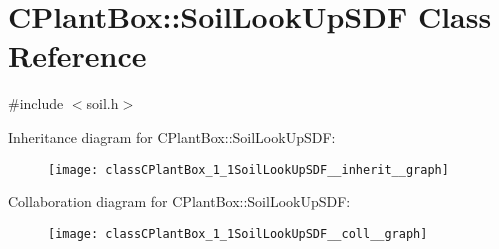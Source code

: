 \hypertarget{classCPlantBox_1_1SoilLookUpSDF}{}\section{C\+Plant\+Box\+:\+:Soil\+Look\+Up\+S\+DF Class Reference}
\label{classCPlantBox_1_1SoilLookUpSDF}


{\ttfamily \#include $<$soil.\+h$>$}



Inheritance diagram for C\+Plant\+Box\+:\+:Soil\+Look\+Up\+S\+DF\+:\nopagebreak
\begin{figure}[H]
\begin{center}
\leavevmode
\texttt{[image: classCPlantBox\_1\_1SoilLookUpSDF\_\_inherit\_\_graph]}
\end{center}
\end{figure}


Collaboration diagram for C\+Plant\+Box\+:\+:Soil\+Look\+Up\+S\+DF\+:\nopagebreak
\begin{figure}[H]
\begin{center}
\leavevmode
\texttt{[image: classCPlantBox\_1\_1SoilLookUpSDF\_\_coll\_\_graph]}
\end{center}
\end{figure}
